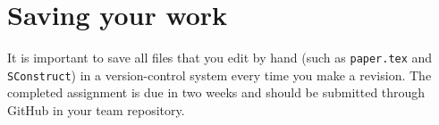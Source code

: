 \lstset{language=python,numbers=left,numberstyle=\tiny,showstringspaces=false}


\section{Saving your work}

It is important to save all files that you edit by hand (such
as \texttt{paper.tex} and \texttt{SConstruct}) in a version-control
system every time you make a revision. The completed assignment is due
in two weeks and should be submitted through GitHub in your team
repository.



